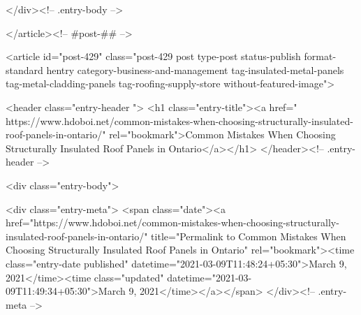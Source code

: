 		
			</div><!-- .entry-body -->

</article><!-- #post-## -->

			
				
<article id="post-429" class="post-429 post type-post status-publish format-standard hentry category-business-and-management tag-insulated-metal-panels tag-metal-cladding-panels tag-roofing-supply-store without-featured-image">

	
	<header class="entry-header ">
					<h1 class="entry-title"><a href=" https://www.hdoboi.net/common-mistakes-when-choosing-structurally-insulated-roof-panels-in-ontario/" rel="bookmark">Common Mistakes When Choosing Structurally Insulated Roof Panels in Ontario</a></h1>			</header><!-- .entry-header -->

	<div class="entry-body">

				<div class="entry-meta">
			<span class="date"><a href="https://www.hdoboi.net/common-mistakes-when-choosing-structurally-insulated-roof-panels-in-ontario/" title="Permalink to Common Mistakes When Choosing Structurally Insulated Roof Panels in Ontario" rel="bookmark"><time class="entry-date published" datetime="2021-03-09T11:48:24+05:30">March 9, 2021</time><time class="updated" datetime="2021-03-09T11:49:34+05:30">March 9, 2021</time></a></span>		</div><!-- .entry-meta -->
		
